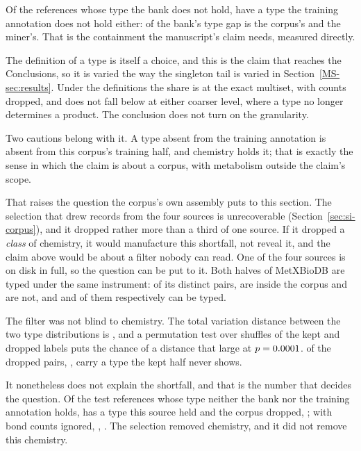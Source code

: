 \documentclass[journal=jcisd8,manuscript=suppinfo,layout=onecolumn]{achemso}
\begin{document}
Of the \numTypeoverlapBanklacks{} references whose type the bank does not hold,
\numTypeoverlapCorpuslackstoo{} have a type the training annotation does not hold either:
\numTypeoverlapCorpussharePct{} of the bank's type gap is the corpus's and
\numTypeoverlapMinerssharePct{} the miner's. That is the containment the manuscript's claim needs,
measured directly.

The definition of a type is itself a choice, and this is the claim that reaches the Conclusions, so
it is varied the way the singleton tail is varied in Section~\ref{MS-sec:results}. Under the
\numTypeoverlapGranularitiesWord{} definitions the share is
\numTypeoverlapCorpussharePct{} at the exact multiset,
\numTypeoverlapCoarsesharePct{} with counts dropped, and does not fall below
\numTypeoverlapSharemin{} at either coarser level, where a type no longer determines a product.
The conclusion does not turn on the granularity.

Two cautions belong with it. A type absent from the training annotation is absent from this
corpus's training half, and chemistry holds it; that is exactly the sense in which the claim is
about a corpus, with metabolism outside the claim's scope.

That raises the question the corpus's own assembly puts to this section. The selection that drew
records from the four sources is unrecoverable (Section~\ref{sec:si-corpus}), and it dropped
rather more than a third of one source. If it dropped a \emph{class} of chemistry, it would
manufacture this shortfall, not reveal it, and the claim above would be about a filter
nobody can read. One of the four sources is on disk in full, so the question can be put to it.
Both halves of MetXBioDB are typed under the same instrument: of its \numMetxdropPairs{} distinct
pairs, \numMetxdropInside{} are inside the corpus and \numMetxdropDropped{} are not, and
\numMetxdropTypedkept{} and \numMetxdropTypeddropped{} of them respectively can be typed.

The filter was not blind to chemistry. The total variation distance between the two type
distributions is \numMetxdropTv{}, and a permutation test over \numMetxdropPerm{} shuffles of
the kept and dropped labels puts the chance of a distance that large at
$p=0.0001$. \numMetxdropDroppedtypesabsent{} of the dropped pairs,
\numMetxdropDroppedtypesabsentsharePct{}, carry a type the kept half never shows.

It nonetheless does not explain the shortfall, and that is the number that decides the question.
Of the \numMetxdropAbsentcell{} test references whose type neither the bank nor the training
annotation holds, \numMetxdropRecoverableWord{} has a type this source held and the corpus
dropped, \numMetxdropRecoverablesharePct{}; with bond counts ignored,
\numMetxdropRecoverablecoarse{}, \numMetxdropRecoverablecoarsesharePct{}. The selection removed
chemistry, and it did not remove this chemistry.
\end{document}
